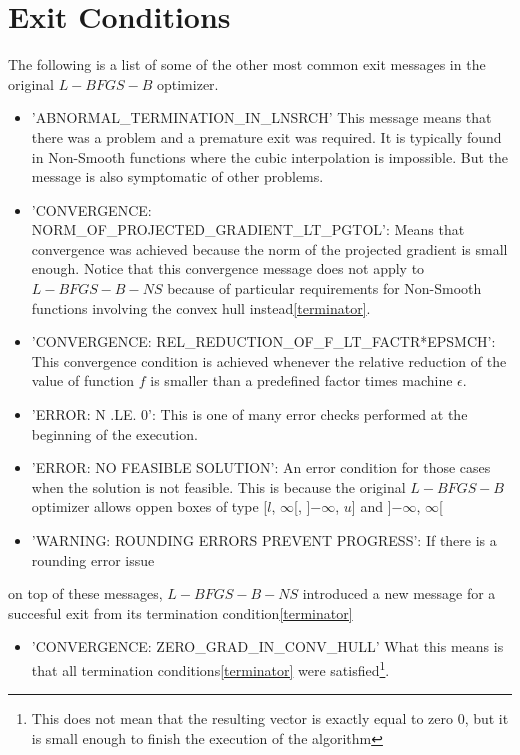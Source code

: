 \section{Exit Conditions}

The following is a list of some of the other most common exit messages in the original $L-BFGS-B$ optimizer.

\begin{itemize}

\item 'ABNORMAL\_TERMINATION\_IN\_LNSRCH' This message means that there was a problem and a premature exit was required. It is typically found in Non-Smooth functions where the cubic interpolation is impossible. But the message is also symptomatic of other problems.

\item 'CONVERGENCE: NORM\_OF\_PROJECTED\_GRADIENT\_LT\_PGTOL': Means that convergence was achieved because the norm of the projected gradient is small enough. Notice that this convergence message does not apply to $L-BFGS-B-NS$ because of particular requirements for Non-Smooth functions involving the convex hull instead\ref{terminator}.
\item 'CONVERGENCE: REL\_REDUCTION\_OF\_F\_LT\_FACTR*EPSMCH': This convergence condition is achieved whenever the relative reduction of the value of function $f$ is smaller than a predefined factor times machine $\epsilon$.

\item 'ERROR: N .LE. 0': This is one of many error checks performed at the beginning of the execution.

\item 'ERROR: NO FEASIBLE SOLUTION': An error condition for those cases when the solution is not feasible. This is because the original $L-BFGS-B$ optimizer allows oppen boxes of type [$l$, $\infty$[, ]$-\infty$, $u$] and ]$-\infty$, $\infty$[

\item 'WARNING: ROUNDING ERRORS PREVENT PROGRESS': If there is a rounding error issue

\end{itemize}

on top of these messages, $L-BFGS-B-NS$ introduced a new message for a succesful exit from its termination condition\ref{terminator}

\begin{itemize}
\item 'CONVERGENCE: ZERO\_GRAD\_IN\_CONV\_HULL' What this means is that all termination conditions\ref{terminator} were satisfied\footnote{This does not mean that the resulting vector is exactly equal to zero $0$, but it is small enough to finish the execution of the algorithm}.
\end{itemize}

